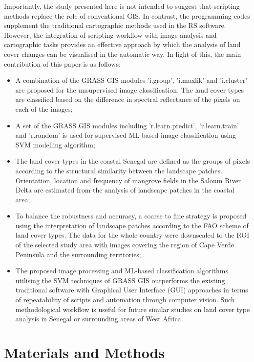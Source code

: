 \documentclass[earth,article,submit,pdftex,moreauthors]{Definitions/mdpi}
\begin{document}
Importantly, the study presented here is not intended to suggest that scripting methods {replace }{the role of conventional GIS}. In contrast, the programming codes{ }supplement the traditional cartographic methods used in the {RS} software. However, the integration of scripting workflow with image analysis{ }and cartographic {tasks} provides an effective approach by which the analysis of land cover changes can be visualised in the automatic way. {In light of this, }the main contribution of this paper is as follows: 

\begin{itemize}
  \item A combination of the GRASS GIS modules 'i.group', 'i.maxlik' and 'i.cluster' are proposed for {the }{unsupervised }image classification. The land cover types are classified based on the difference in spectral reflectance of the pixels on {each of }the images;
  \item {A set of the GRASS GIS modules {including} 'r.learn.predict', 'r.learn.train' and 'r.random' is used for supervised ML-based image classification using {SVM} modelling algorithm;}
  \item The land cover types in the coastal Senegal are defined as the groups of pixels according to the structural similarity between the landscape patches. Orientation, location and frequency of mangrove fields in the Saloum River Delta are estimated from the analysis of landscape patches in the coastal area;
  \item To balance {the} robustness and accuracy, a coarse to fine strategy is proposed {using} the interpretation of landscape patches {according to the} FAO scheme of land cover types{. The data for the whole country were} downscaled to the ROI of the selected study area with images covering the region of Cape Verde Peninsula and the surrounding territories;
  \item The proposed image processing and {ML-based }classification algorithms utilising the {SVM techniques of }GRASS GIS outperforms {the }existing traditional software with {Graphical User Interface (GUI)} approaches in terms of repeatability of scripts and automation {through computer vision. Such methodological workflow }is useful for future similar studies {on} land cover type analysis in Senegal {or surrounding areas of West Africa}.
\end{itemize}

\section{Materials and Methods}
\end{document}
